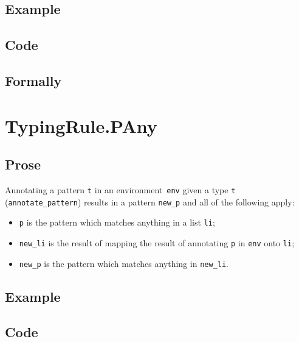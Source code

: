 \documentclass{book}
\begin{document}
  \subsection{Example}

  \subsection{Code}

\begin{emptyformal}
    \subsection{Formally}
\end{emptyformal}


\section{TypingRule.PAny\label{sec:TypingRule.PAny}}

  \subsection{Prose}
   Annotating a pattern \texttt{t} in an environment~\texttt{env} given a type \texttt{t} (\texttt{annotate\_pattern}) results in a pattern \texttt{new\_p} and all of the following apply:
   \begin{itemize}
   \item \texttt{p} is the pattern which matches anything in a list \texttt{li};
   \item \texttt{new\_li} is the result of mapping the result of annotating \texttt{p} in \texttt{env} onto \texttt{li};
   \item \texttt{new\_p} is the pattern which matches anything in \texttt{new\_li}.
   \end{itemize}

  \subsection{Example}

  \subsection{Code}
\end{document}
